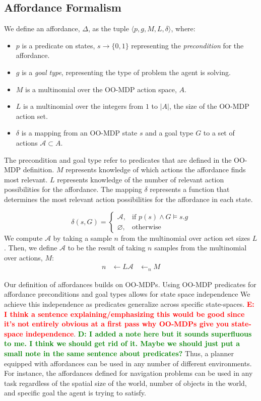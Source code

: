 \documentclass[conference]{IEEEtran}
\newcommand{\dnote}[1]{\textcolor{Green}{\textbf{D: #1}}}
\newcommand{\enote}[1]{\textcolor{Red}{\textbf{E: #1}}}
\begin{document}
\subsection{Affordance Formalism}
 We define an affordance, $\Delta$, as the tuple $\langle p, g, M, L, \delta\rangle$,
where:
\begin{itemize}
\item $p$ is a predicate on states, $s \longrightarrow \{$0$, 1\}$ representing the {\em precondition} for the affordance. 
\item $g$ is a {\it goal type}, representing the type of problem the agent is solving.
\item $M$ is a multinomial over the OO-MDP action space, $A$.
\item $L$ is a multinomial over the integers from $1$ to $|A|$, the size of the OO-MDP action set.
\item $\delta$ is a mapping from an OO-MDP state $s$ and a goal type $G$ to a set of actions $\mathcal{A} \subset A$.
\end{itemize}

The precondition and goal type refer to predicates that are defined in the OO-MDP definition.
$M$ represents knowledge of which actions the affordance finds most relevant. $L$ represents
knowledge of the number of relevant action possibilities for the affordance. The mapping $\delta$
represents a function that determines the most relevant action possibilities for the affordance in each state.

\[
    \delta(s,G)= 
\begin{cases}
    \mathcal{A},& \text{if } p(s) \wedge G \models s.g \\
    \varnothing,              & \text{otherwise}
\end{cases}
\]
We compute $\mathcal{A}$ by taking a sample $n$ from the multinomial over action set sizes $L$. Then,
we define $\mathcal{A}$ to be the result of taking $n$ samples from the multinomial over actions, $M$:
\begin{align}
n &\leftarrow L
\mathcal{A} &\leftarrow_n M
\end{align}

Our definition of affordances builds on OO-MDPs. Using OO-MDP predicates for affordance preconditions and goal types 
allows for state space independence We achieve this independence as predicates generalize across specific state-spaces. \enote{I think a sentence explaining/emphasizing this would be good since it's not entirely obvious at a first pass why OO-MDPs give you state-space independence}. \dnote{I added a note here but it sounds superfluous to me. I think we should get rid of it. Maybe we should just put a small note in the same sentence about predicates?} Thus, a planner equipped with
affordances can be used in any number of different environments. For instance, the affordances defined for 
navigation problems can be used in any task regardless of the spatial size of the world, 
number of objects in the world, and specific goal the agent is trying to satisfy.
\end{document}
